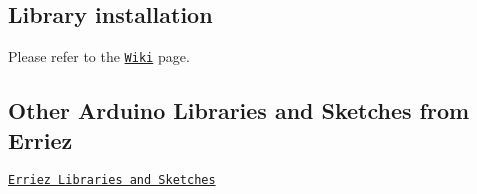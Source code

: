 \subsection*{Library installation}

Please refer to the \href{https://github.com/Erriez/ErriezArduinoLibrariesAndSketches/wiki}{\tt Wiki} page.

\subsection*{Other Arduino Libraries and Sketches from Erriez}


\begin{DoxyItemize}
\item \href{https://github.com/Erriez/ErriezArduinoLibrariesAndSketches}{\tt Erriez Libraries and Sketches} 
\end{DoxyItemize}